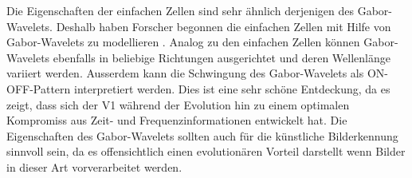 Die Eigenschaften der einfachen Zellen sind sehr ähnlich derjenigen des Gabor-Wavelets.
Deshalb haben Forscher begonnen die einfachen Zellen mit Hilfe von Gabor-Wavelets zu modellieren \cite{paper:imgrep}.
Analog zu den einfachen Zellen können Gabor-Wavelets ebenfalls in beliebige Richtungen ausgerichtet und deren Wellenlänge variiert werden.
Ausserdem kann die Schwingung des Gabor-Wavelets als ON-OFF-Pattern interpretiert werden.
Dies ist eine sehr schöne Entdeckung, da es zeigt, dass sich der V1 während der Evolution hin zu einem optimalen Kompromiss aus Zeit- und Frequenzinformationen entwickelt hat.
Die Eigenschaften des Gabor-Wavelets sollten auch für die künstliche Bilderkennung sinnvoll sein, da es offensichtlich einen evolutionären Vorteil darstellt wenn Bilder in dieser Art vorverarbeitet werden.